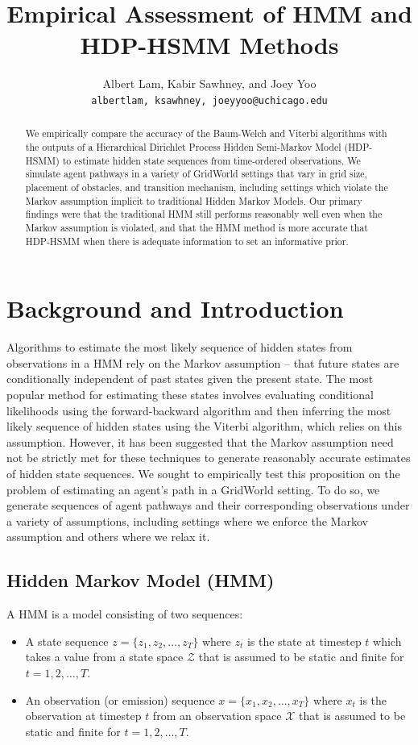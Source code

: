 \documentclass{article}
\title{Empirical Assessment of HMM and HDP-HSMM Methods}
\author{%
  Albert Lam, Kabir Sawhney, and Joey Yoo \\
  \texttt{albertlam, ksawhney, joeyyoo@uchicago.edu} \\
}
\begin{document}

\maketitle

\begin{abstract}
We empirically compare the accuracy of the Baum-Welch and Viterbi algorithms with the outputs of a Hierarchical Dirichlet Process Hidden Semi-Markov Model (HDP-HSMM) to estimate hidden state sequences from time-ordered observations. We simulate agent pathways in a variety of GridWorld settings that vary in grid size, placement of obstacles, and transition mechanism, including settings which violate the Markov assumption implicit to traditional Hidden Markov Models. Our primary findings were that the traditional HMM still performs reasonably well even when the Markov assumption is violated, and that the HMM method is more accurate that HDP-HSMM when there is adequate information to set an informative prior.
\end{abstract}

\section{Background and Introduction}

Algorithms to estimate the most likely sequence of hidden states from observations in a HMM rely on the Markov assumption -- that future states are conditionally independent of past states given the present state. The most popular method for estimating these states involves evaluating conditional likelihoods using the forward-backward algorithm and then inferring the most likely sequence of hidden states using the Viterbi algorithm, which relies on this assumption. However, it has been suggested that the Markov assumption need not be strictly met for these techniques to generate reasonably accurate estimates of hidden state sequences. We sought to empirically test this proposition on the problem of estimating an agent's path in a GridWorld setting. To do so, we generate sequences of agent pathways and their corresponding observations under a variety of assumptions, including settings where we enforce the Markov assumption and others where we relax it.

\subsection{Hidden Markov Model (HMM)}
A HMM is a model consisting of two sequences:
\begin{itemize}
  \item A state sequence $z = \{z_1, z_2, \dots, z_T\}$ where $z_t$ is the state at timestep $t$ which takes a value from a state space $\mathcal{Z}$ that is assumed to be static and finite for $t = 1, 2, \dots, T$.
  \item An observation (or emission) sequence $x = \{x_1, x_2, \dots, x_T\}$ where $x_t$ is the observation at timestep $t$ from an observation space $\mathcal{X}$ that is assumed to be static and finite for $t = 1, 2, \dots, T$.
\end{itemize}
\end{document}
